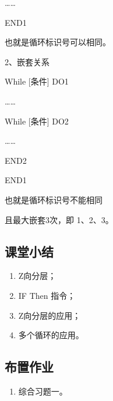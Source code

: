 	…… 
	
	END1
	
	也就是循环标识号可以相同。
	

	2、嵌套关系

	While [条件] DO1

	……

	While [条件] DO2

	…… 

	END2

	END1

	也就是循环标识号不能相同

	且最大嵌套3次，即 1、2、3。

\subsection{课堂小结}
\begin{enumerate}[1、]
\item Z向分层；
\item IF Then 指令；
\item Z向分层的应用；
\item 多个循环的应用。
\end{enumerate}

\vfill
\subsection{布置作业}
\begin{enumerate}[1、]
	\item 综合习题一。
\end{enumerate}
\vfill